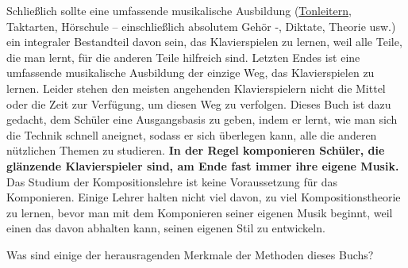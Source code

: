 Schließlich sollte eine umfassende musikalische Ausbildung (\hyperref[c1iii5a]{Tonleitern}, Taktarten, Hörschule -- einschließlich absolutem Gehör -, Diktate, Theorie usw.) ein integraler Bestandteil davon sein, das Klavierspielen zu lernen, weil alle Teile, die man lernt, für die anderen Teile hilfreich sind.
Letzten Endes ist eine umfassende musikalische Ausbildung der einzige Weg, das Klavierspielen zu lernen.
Leider stehen den meisten angehenden Klavierspielern nicht die Mittel oder die Zeit zur Verfügung, um diesen Weg zu verfolgen.
Dieses Buch ist dazu gedacht, dem Schüler eine Ausgangsbasis zu geben, indem er lernt, wie man sich die Technik schnell aneignet, sodass er sich überlegen kann, alle die anderen nützlichen Themen zu studieren.
\textbf{In der Regel komponieren Schüler, die glänzende Klavierspieler sind, am Ende fast immer ihre eigene Musik.}
Das Studium der Kompositionslehre ist keine Voraussetzung für das Komponieren.
Einige Lehrer halten nicht viel davon, zu viel Kompositionstheorie zu lernen, bevor man mit dem Komponieren seiner eigenen Musik beginnt, weil einen das davon abhalten kann, seinen eigenen Stil zu entwickeln.

Was sind einige der herausragenden Merkmale der Methoden dieses Buchs?

